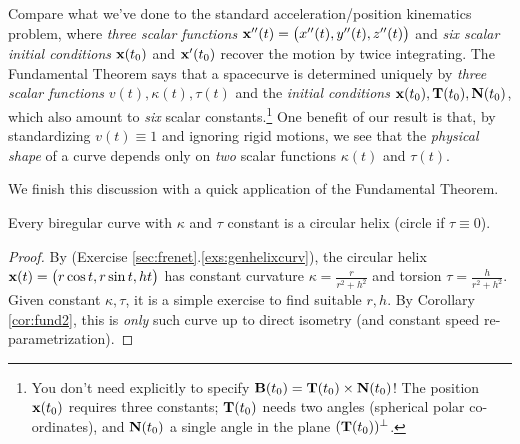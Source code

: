 
Compare what we've done to the standard acceleration/position kinematics problem, where \emph{three scalar functions} ${\mathbf{x}}''(t)=\bigl(x''(t),y''(t),z''(t)\bigr)$ and \emph{six scalar initial conditions} ${\mathbf{x}}(t_0)$ and ${\mathbf{x}}'(t_0)$ recover the motion by twice integrating.\smallbreak
The Fundamental Theorem says that a spacecurve is determined uniquely by \emph{three scalar functions} $v(t),\kappa(t),\tau(t)$ and the \emph{initial conditions} ${\mathbf{x}}(t_0),{\mathbf{T}}(t_0),{\mathbf{N}}(t_0)$, which also amount to \emph{six} scalar constants.\footnote{You don't need explicitly to specify ${\mathbf{B}}(t_0)={\mathbf{T}}(t_0)\times{\mathbf{N}}(t_0)$! The position ${\mathbf{x}}(t_0)$ requires three constants; ${\mathbf{T}}(t_0)$ needs two angles (spherical polar co-ordinates), and ${\mathbf{N}}(t_0)$ a single angle in the plane $({\mathbf{T}}(t_0))^\perp$.}\smallbreak
One benefit of our result is that, by standardizing $v(t)\equiv 1$ and ignoring rigid motions, we see that the \emph{physical shape} of a curve depends only on \emph{two} scalar functions $\kappa(t)$ and $\tau(t)$.\bigbreak


\goodbreak

We finish this discussion with a quick application of the Fundamental Theorem.

\begin{cor}{}{}
	Every biregular curve with $\kappa$ and $\tau$ constant is a circular helix (circle if $\tau\equiv 0$).
\end{cor}

\begin{proof}
	By (Exercise \ref*{sec:frenet}.\ref{exs:genhelixcurv}), the circular helix ${\mathbf{x}}(t)=\bigl(r\cos t,r\sin t,ht\bigr)$ has constant curvature $\kappa=\frac r{r^2+h^2}$ and torsion $\tau=\frac h{r^2+h^2}$.\smallbreak
	Given constant $\kappa,\tau$, it is a simple exercise to find suitable $r,h$. By Corollary \ref{cor:fund2}, this is \emph{only} such curve up to direct isometry (and constant speed re-parametrization).
\end{proof}



